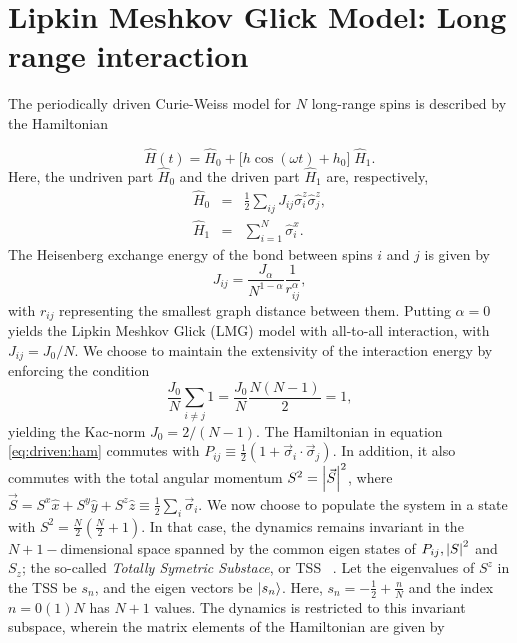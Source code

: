\documentclass[%
reprint,
superscriptaddress,
amsmath,amssymb,
aps,
prb,
showkeys,
]{revtex4-2}
\begin{document}
	\section{\label{sec:level3}Lipkin Meshkov Glick Model: Long range interaction}	
	The periodically driven Curie-Weiss model for $N$ long-range spins is described by the Hamiltonian

	\begin{equation}
		\hat{H}(t) = \hat{H}_0 + \big[h \cos{(\omega t)} + h_0\big]\; \hat{H}_1.
		\label{eq:driven:ham}
	\end{equation}
	Here, the undriven part $\hat{H}_0$ and the driven part $\hat{H}_1$ are, respectively, 
	\begin{eqnarray}
		\label{eq:curieweiss:ham}
		\hat{H}_0 &=& \frac12 \sum_{ij}J_{ij}\hat{\sigma}^z_i\hat{\sigma}^z_j,\\
		\hat{H}_1 &=& \sum^N_{i=1}\hat{\sigma}^x_i.\nonumber
	\end{eqnarray}
	The Heisenberg exchange energy of the bond between spins $i$ and $j$ is given by
	\begin{equation}
		\label{eq:jij}
		J_{ij} =\frac{J_\alpha}{N^{1-\alpha}}\frac{1}{r_{ij}^{\alpha}},
	\end{equation}
	with $r_{ij}$ representing the smallest graph distance between them.
	Putting  $\alpha = 0$ yields the Lipkin Meshkov Glick (LMG) model with all-to-all interaction, with $J_{ij} = J_0/N$. We choose to maintain the extensivity of the interaction energy by enforcing the condition
	\begin{equation*}
		\frac{J_0}{N} \sum_{i\neq j}1=\frac{J_0}{N}\frac{N(N-1)}{2}=1,
	\end{equation*}
	yielding the Kac-norm $J_0=2/(N-1)$. The Hamiltonian in equation \ref{eq:driven:ham} commutes with $P_{ij} \equiv \displaystyle\frac{1}{2}\left(1+ \vec{\sigma}_i\cdot\vec{\sigma}_j\right)$. In addition, it also commutes with the total angular momentum $S^2 = \abs{\vec{S}}^2$, where $\vec{S}=S^x\hat{x}+S^y\hat{y}+S^z\hat{z}\equiv\frac12 \sum_i \vec{\sigma}_i$. We now choose to populate the system in a state with $S^2=\displaystyle\frac{N}{2}\left(\frac{N}{2}+1\right)$. In that case, the dynamics remains invariant in the  $N+1-$dimensional space spanned by the common eigen states of $P_{ij}, \abs{S}^2$ and $S_z$; the so-called \textit{ Totally Symetric Substace}, or TSS ~\cite{mori_prethermalization_2019}. Let the eigenvalues of $S^z$ in the TSS be $s_n$, and the eigen vectors be $\ket{s_n}$. Here, $s_n=-\frac{1}{2}+\frac{n}{N}$ and the index
	$n= 0 (1) N$ has $N+1$ values. The dynamics is restricted to this invariant subspace, wherein the matrix elements of the Hamiltonian are given by
	
\end{document}
